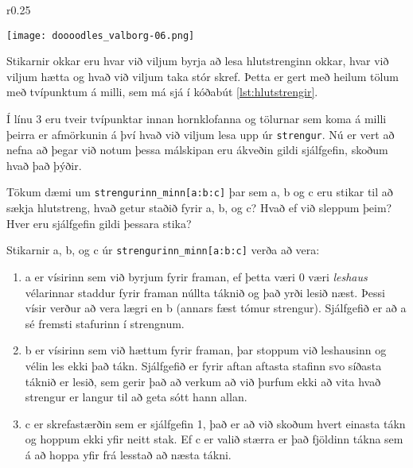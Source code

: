 \begin{wrapfigure}{r}{0.25\textwidth}
	\begin{center}
		\texttt{[image: doooodles\_valborg-06.png]}
	\end{center}
\end{wrapfigure}

Stikarnir okkar eru hvar við viljum byrja að lesa hlutstrenginn okkar, hvar við viljum hætta og hvað við viljum taka stór skref.
Þetta er gert með heilum tölum með tvípunktum á milli, sem má sjá í kóðabút \ref{lst:hlutstrengir}.

Í línu 3 eru tveir tvípunktar innan hornklofanna og tölurnar sem koma á milli þeirra er afmörkunin á því hvað við viljum lesa upp úr \texttt{strengur}.
Nú er vert að nefna að þegar við notum þessa málskipan eru ákveðin gildi sjálfgefin, skoðum hvað það þýðir.

Tökum dæmi um \texttt{strengurinn\_minn[a:b:c]} þar sem a, b og c eru stikar til að sækja hlutstreng, hvað getur staðið fyrir a, b, og c? Hvað ef við sleppum þeim? Hver eru sjálfgefin gildi þessara stika?

\newpage
Stikarnir a, b, og c úr \texttt{strengurinn\_minn[a:b:c]} verða að vera:
\begin{enumerate}
	\item a er vísirinn sem við byrjum fyrir framan, ef þetta væri 0 væri \textit{leshaus} vélarinnar staddur fyrir framan núllta táknið og það yrði lesið næst.
	Þessi vísir verður að vera lægri en b (annars fæst tómur strengur).
	Sjálfgefið er að a sé fremsti stafurinn í strengnum.
	\item b er vísirinn sem við hættum fyrir framan, þar stoppum við leshausinn og vélin les ekki það tákn.
	Sjálfgefið er fyrir aftan aftasta stafinn svo síðasta táknið er lesið, sem gerir það að verkum að við þurfum ekki að vita hvað strengur er langur til að geta sótt hann allan.
	\item c er skrefastærðin sem er sjálfgefin 1, það er að við skoðum hvert einasta tákn og hoppum ekki yfir neitt stak.
	Ef c er valið stærra er það fjöldinn tákna sem á að hoppa yfir frá lesstað að næsta tákni.
\end{enumerate}

